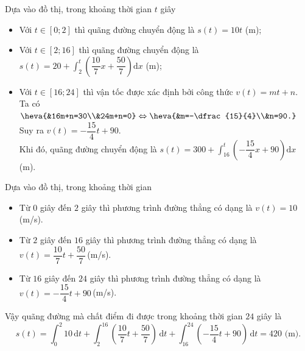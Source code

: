\begin{ex}
{\begin{itemchoice}
			\itemch Dựa vào đồ thị,  trong khoảng thời gian $t$ giây
			\begin{itemize}
				\item Với $t\in  [0;2]$ thì quãng đường chuyển động là $s(t)=10t$ (m);
				\item Với $t\in  [2;16]$ thì quãng đường chuyển động là $s(t)=20+\displaystyle\int_2^t \left(\dfrac{10}{7}x+\dfrac{50}{7}\right)\mathrm{d}x$ (m);
				\item Với $t\in [16;24]$ thì vận tốc được xác định bởi công thức 
				 $v(t)=mt+n$.\\
				Ta có  $\heva{&16m+n=30\\&24m+n=0}\Leftrightarrow\heva{&m=-\dfrac{15}{4}\\&n=90.}$\\
				Suy ra  $v(t)=-\dfrac{15}{4}t+90$.\\
				Khi đó, quãng  đường chuyển động là $s(t)=300+\displaystyle\int_{16}^{t} \left(-\dfrac{15}{4}x+90\right)\mathrm{d}x$ (m).
			\end{itemize}
			 \itemch Dựa vào đồ thị, trong khoảng thời gian
			\begin{itemize}
				\item Từ $0$ giây đến $2$ giây thì phương trình  đường thẳng có dạng là $v(t)=10$\,(m/s).
				\item Từ $2$ giây đến $16$ giây thì phương trình đường thẳng có dạng là $v(t)=\dfrac{10}{7}t+\dfrac{50}{7}$\,(m/s). 
				\item Từ $16$ giây đến $24$ giây thì phương trình đường thẳng  có dạng là \break $v(t)=-\dfrac{15}{4}t+90$\,(m/s).
			\end{itemize}
			Vậy quãng đường mà chất điểm đi được trong  khoảng thời gian $24$ giây là \[s(t)=\displaystyle\int_0^2 10 \mathrm{\,d}t+\displaystyle\int_2^{16} \left(\dfrac{10}{7}t+\dfrac{50}{7}\right)\mathrm{\,d}t+\displaystyle\int_{16}^{24} \left(-\dfrac{15}{4}t+90\right)\mathrm{\,d}t=420 \text{ (m).}\]
		\end{itemchoice}
	} 
\end{ex}

